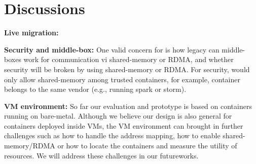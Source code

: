 \section{Discussions} \label{sec:discussion}


\textbf{Live migration:} 


\textbf{Security and middle-box:}
One valid concern for \sysname is how legacy can middle-boxes work for communication
vi shared-memory or RDMA, and whether security will be broken by using shared-memory or RDMA.
For security, \sysname would only allow shared-memory among trusted containers, for example,
container belongs to the same vendor (e.g., running spark or storm). 


\textbf{VM environment:}
So far our evaluation and prototype is based on containers running on bare-metal. 
Although we believe our design is also general for containers deployed inside VMs,
the VM environment can brought in further challenges such as how to handle the
address mapping, how to enable shared-memory/RDMA or how to locate the containers
and measure the utility of resources. We will address these challenges in our futureworks.
